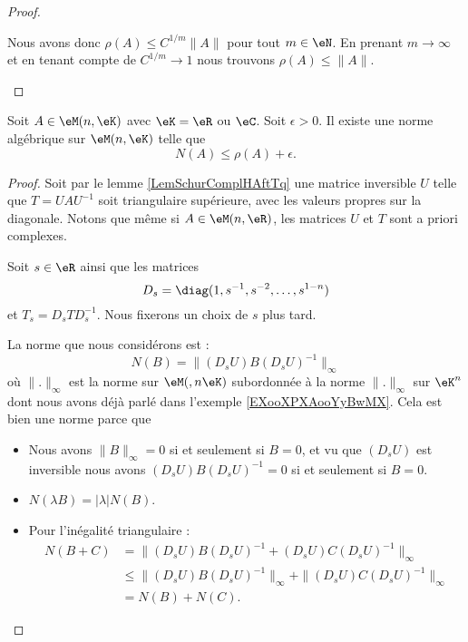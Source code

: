 \begin{proof}
\begin{subproof}
            Nous avons donc \( \rho(A)\leq C^{1/m}\| A \|\) pour tout \( m\in\eN\). En prenant \( m\to \infty\) et en tenant compte de \( C^{1/m}\to 1\) nous trouvons \( \rho(A)\leq \| A \|\).
    \end{subproof}
\end{proof}

\begin{lemma}        \label{LEMooGBLJooCPvxNl}
    Soit \( A\in \eM(n,\eK)\) avec \( \eK=\eR\) ou \( \eC\). Soit \( \epsilon>0\). Il existe une norme algébrique sur \( \eM(n,\eK)\) telle que
    \begin{equation}
        N(A)\leq \rho(A)+\epsilon.
    \end{equation}
\end{lemma}

\begin{proof}
    Soit par le lemme \ref{LemSchurComplHAftTq} une matrice inversible \( U\) telle que \( T=UAU^{-1}\) soit triangulaire supérieure, avec les valeurs propres sur la diagonale. Notons que même si \( A\in \eM(n,\eR)\), les matrices \( U\) et \( T\) sont a priori complexes.

    Soit \( s\in \eR\) ainsi que les matrices
    \begin{equation}
        D_s=\diag(1,s^{-1},s^{-2},\ldots, s^{1-n})
    \end{equation}
    et \( T_s=D_sTD_s^{-1}\). Nous fixerons un choix de \( s\) plus tard.  

    La norme que nous considérons est :
    \begin{equation}
        N(B)=\| (D_sU)B(D_sU)^{-1} \|_{\infty}
    \end{equation}
    où \( \| . \|_{\infty}\) est la norme sur \( \eM(,n\eK)\) subordonnée à la norme \( \| . \|_{\infty}\) sur \( \eK^n\) dont nous avons déjà parlé dans l'exemple \ref{EXooXPXAooYyBwMX}. Cela est bien une norme parce que
    \begin{itemize}
        \item Nous avons \( \| B \|_{\infty}=0\) si et seulement si \( B=0\), et vu que \( (D_sU)\) est inversible nous avons \( (D_sU)B(D_sU)^{-1}=0\) si et seulement si \( B=0\).
        \item \( N(\lambda B)=| \lambda |N(B)\).
        \item Pour l'inégalité triangulaire :
            \begin{subequations}
                \begin{align}
             N(B+C)&=\| (D_sU)B(D_sU)^{-1}+(D_sU)C(D_sU)^{-1} \|_{\infty}\\
             &\leq  \| (D_sU)B(D_sU)^{-1}\|_{\infty} +\| (D_sU)C(D_sU)^{-1} \|_{\infty} \\
             &=N(B)+N(C).
                \end{align}
            \end{subequations}
    \end{itemize}
    

\end{proof}
